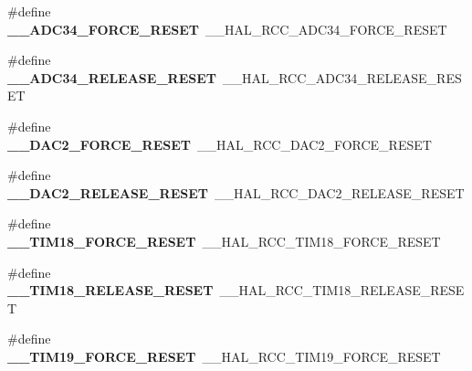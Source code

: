 \begin{DoxyCompactItemize}
\item 
\mbox{\label{group___h_a_l___r_c_c___aliased_ga9d32ad39aa9a52a93e5cc48977fac1a1}} 
\#define {\bfseries \+\_\+\+\_\+\+A\+D\+C34\+\_\+\+F\+O\+R\+C\+E\+\_\+\+R\+E\+S\+ET}~\+\_\+\+\_\+\+H\+A\+L\+\_\+\+R\+C\+C\+\_\+\+A\+D\+C34\+\_\+\+F\+O\+R\+C\+E\+\_\+\+R\+E\+S\+ET
\item 
\mbox{\label{group___h_a_l___r_c_c___aliased_gad758bcf779fd9cab005fcc8fc6bf23ae}} 
\#define {\bfseries \+\_\+\+\_\+\+A\+D\+C34\+\_\+\+R\+E\+L\+E\+A\+S\+E\+\_\+\+R\+E\+S\+ET}~\+\_\+\+\_\+\+H\+A\+L\+\_\+\+R\+C\+C\+\_\+\+A\+D\+C34\+\_\+\+R\+E\+L\+E\+A\+S\+E\+\_\+\+R\+E\+S\+ET
\item 
\mbox{\label{group___h_a_l___r_c_c___aliased_gaf8cc5ae83a56884ca8e347a876f425b3}} 
\#define {\bfseries \+\_\+\+\_\+\+D\+A\+C2\+\_\+\+F\+O\+R\+C\+E\+\_\+\+R\+E\+S\+ET}~\+\_\+\+\_\+\+H\+A\+L\+\_\+\+R\+C\+C\+\_\+\+D\+A\+C2\+\_\+\+F\+O\+R\+C\+E\+\_\+\+R\+E\+S\+ET
\item 
\mbox{\label{group___h_a_l___r_c_c___aliased_ga2ca6c2de66e0242e9941d090e8e99ecd}} 
\#define {\bfseries \+\_\+\+\_\+\+D\+A\+C2\+\_\+\+R\+E\+L\+E\+A\+S\+E\+\_\+\+R\+E\+S\+ET}~\+\_\+\+\_\+\+H\+A\+L\+\_\+\+R\+C\+C\+\_\+\+D\+A\+C2\+\_\+\+R\+E\+L\+E\+A\+S\+E\+\_\+\+R\+E\+S\+ET
\item 
\mbox{\label{group___h_a_l___r_c_c___aliased_ga6b03e584a99a7145ffd9953327722870}} 
\#define {\bfseries \+\_\+\+\_\+\+T\+I\+M18\+\_\+\+F\+O\+R\+C\+E\+\_\+\+R\+E\+S\+ET}~\+\_\+\+\_\+\+H\+A\+L\+\_\+\+R\+C\+C\+\_\+\+T\+I\+M18\+\_\+\+F\+O\+R\+C\+E\+\_\+\+R\+E\+S\+ET
\item 
\mbox{\label{group___h_a_l___r_c_c___aliased_ga062debe81b59ed9a88bcf4258e09dbaf}} 
\#define {\bfseries \+\_\+\+\_\+\+T\+I\+M18\+\_\+\+R\+E\+L\+E\+A\+S\+E\+\_\+\+R\+E\+S\+ET}~\+\_\+\+\_\+\+H\+A\+L\+\_\+\+R\+C\+C\+\_\+\+T\+I\+M18\+\_\+\+R\+E\+L\+E\+A\+S\+E\+\_\+\+R\+E\+S\+ET
\item 
\mbox{\label{group___h_a_l___r_c_c___aliased_ga9e4eca7dac56bd682758cf5072f4e063}} 
\#define {\bfseries \+\_\+\+\_\+\+T\+I\+M19\+\_\+\+F\+O\+R\+C\+E\+\_\+\+R\+E\+S\+ET}~\+\_\+\+\_\+\+H\+A\+L\+\_\+\+R\+C\+C\+\_\+\+T\+I\+M19\+\_\+\+F\+O\+R\+C\+E\+\_\+\+R\+E\+S\+ET

\end{DoxyCompactItemize}
